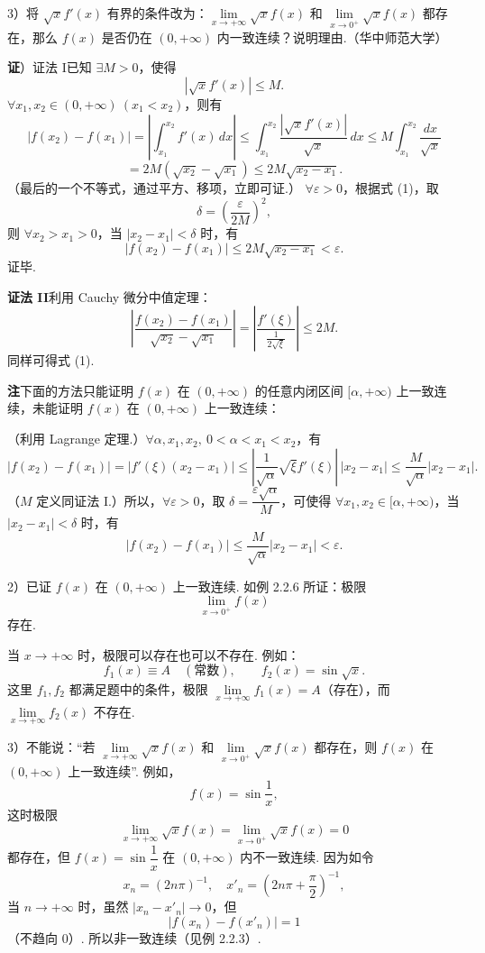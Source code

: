 \documentclass[UTF8, 12pt, fontset=fandol, oneside]{ctexart}
\begin{document}
3）将 $\sqrt{x}f'(x)$ 有界的条件改为：$\lim\limits_{x\to+\infty}\sqrt{x}f(x)$ 和
$\lim\limits_{x\to0^+}\sqrt{x}f(x)$ 都存在，那么 $f(x)$ 是否仍在 $(0,+\infty)$ 内一致连续？说明理由.（华中师范大学）

\noindent\textbf{证}）证法 I\quad 已知 $\exists M>0$，使得
\[
|\sqrt{x}f'(x)|\le M.
\]
$\forall x_1,x_2\in(0,+\infty)\ (x_1<x_2)$，则有
\[
|f(x_2)-f(x_1)|=\left|\int_{x_1}^{x_2}f'(x)\,dx\right|
\le\int_{x_1}^{x_2}\frac{|\sqrt{x}f'(x)|}{\sqrt{x}}\,dx
\le M\int_{x_1}^{x_2}\frac{dx}{\sqrt{x}}
\]
\[
=2M(\sqrt{x_2}-\sqrt{x_1})\le2M\sqrt{x_2-x_1}. \tag{1}
\]
（最后的一个不等式，通过平方、移项，立即可证.）
$\forall\varepsilon>0$，根据式 (1)，取
\[
\delta=\left(\frac{\varepsilon}{2M}\right)^2,
\]
则 $\forall x_2>x_1>0$，当 $|x_2-x_1|<\delta$ 时，有
\[
|f(x_2)-f(x_1)|\le2M\sqrt{x_2-x_1}<\varepsilon.
\]
证毕.

\noindent\textbf{证法 II}\quad 利用 Cauchy 微分中值定理：
\[
\left|\frac{f(x_2)-f(x_1)}{\sqrt{x_2}-\sqrt{x_1}}\right|
=\left|\frac{f'(\xi)}{\frac1{2\sqrt{\xi}}}\right|\le2M.
\]
同样可得式 (1).

\noindent\textbf{注}\quad 下面的方法只能证明 $f(x)$ 在 $(0,+\infty)$ 的任意内闭区间
$[\alpha,+\infty)$ 上一致连续，未能证明 $f(x)$ 在 $(0,+\infty)$ 上一致连续：

（利用 Lagrange 定理.）$\forall\alpha,x_1,x_2,\ 0<\alpha<x_1<x_2$，有
\[
|f(x_2)-f(x_1)|
=|f'(\xi)(x_2-x_1)|
\le\left|\frac1{\sqrt{\alpha}}\sqrt{\xi}f'(\xi)\right|\,|x_2-x_1|
\le\frac M{\sqrt{\alpha}}|x_2-x_1|.
\]
（$M$ 定义同证法 I.）所以，$\forall\varepsilon>0$，取
$\delta=\dfrac{\varepsilon\sqrt{\alpha}}M$，可使得 $\forall x_1,x_2\in[\alpha,+\infty)$，当
$|x_2-x_1|<\delta$ 时，有
\[
|f(x_2)-f(x_1)|\le\frac M{\sqrt{\alpha}}|x_2-x_1|<\varepsilon.
\]

2）已证 $f(x)$ 在 $(0,+\infty)$ 上一致连续. 如例 2.2.6 所证：极限
\[
\lim_{x\to0^+}f(x)
\]
存在.

当 $x\to+\infty$ 时，极限可以存在也可以不存在. 例如：
\[
f_1(x)\equiv A\quad(\text{常数}),\qquad f_2(x)=\sin\sqrt{x}.
\]
这里 $f_1,f_2$ 都满足题中的条件，极限 $\lim\limits_{x\to+\infty}f_1(x)=A$（存在），而
$\lim\limits_{x\to+\infty}f_2(x)$ 不存在.

3）不能说：“若 $\lim\limits_{x\to+\infty}\sqrt{x}f(x)$ 和
$\lim\limits_{x\to0^+}\sqrt{x}f(x)$ 都存在，则 $f(x)$ 在 $(0,+\infty)$ 上一致连续”. 例如，
\[
f(x)=\sin\frac1x,
\]
这时极限
\[
\lim_{x\to+\infty}\sqrt{x}f(x)=\lim_{x\to0^+}\sqrt{x}f(x)=0
\]
都存在，但 $f(x)=\sin\dfrac1x$ 在 $(0,+\infty)$ 内不一致连续. 因为如令
\[
x_n=(2n\pi)^{-1},\quad x'_n=\left(2n\pi+\frac\pi2\right)^{-1},
\]
当 $n\to+\infty$ 时，虽然 $|x_n-x'_n|\to0$，但
\[
|f(x_n)-f(x'_n)|=1
\]
（不趋向 0）. 所以非一致连续（见例 2.2.3）.
\end{document}
